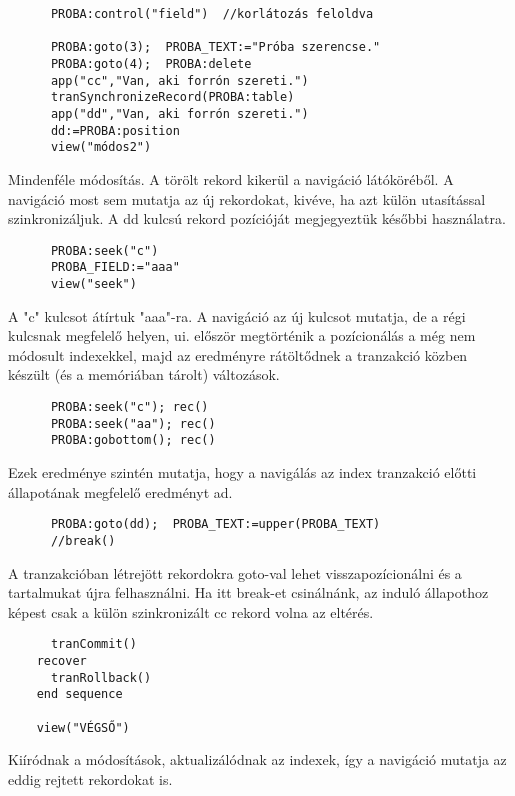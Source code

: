 \begin{verbatim}
      PROBA:control("field")  //korlátozás feloldva
 
      PROBA:goto(3);  PROBA_TEXT:="Próba szerencse." 
      PROBA:goto(4);  PROBA:delete
      app("cc","Van, aki forrón szereti.")
      tranSynchronizeRecord(PROBA:table)
      app("dd","Van, aki forrón szereti.")
      dd:=PROBA:position
      view("módos2")
\end{verbatim}

      Mindenféle módosítás.      
      A törölt rekord kikerül a navigáció látóköréből.
      A navigáció most sem mutatja az új rekordokat,
      kivéve, ha azt külön utasítással szinkronizáljuk.
      A dd kulcsú rekord pozícióját megjegyeztük későbbi
      használatra.

\begin{verbatim}
      PROBA:seek("c")
      PROBA_FIELD:="aaa" 
      view("seek")
\end{verbatim}

      A "c" kulcsot átírtuk {"}aaa"-ra. A navigáció az új kulcsot
      mutatja, de a régi kulcsnak megfelelő helyen, ui. először
      megtörténik a pozícionálás a még nem módosult indexekkel,
      majd az eredményre rátöltődnek a tranzakció közben készült
      (és a memóriában tárolt) változások.

\begin{verbatim}
      PROBA:seek("c"); rec()
      PROBA:seek("aa"); rec()
      PROBA:gobottom(); rec()
\end{verbatim}

      Ezek eredménye szintén mutatja, hogy a navigálás az index
      tranzakció előtti állapotának megfelelő eredményt ad.

\begin{verbatim}
      PROBA:goto(dd);  PROBA_TEXT:=upper(PROBA_TEXT)
      //break()
\end{verbatim}

      A tranzakcióban létrejött rekordokra goto-val lehet
      visszapozícionálni és a tartalmukat újra felhasználni.
      Ha itt break-et csinálnánk, az induló állapothoz képest
      csak a külön szinkronizált cc rekord volna az eltérés.

\begin{verbatim}
      tranCommit()
    recover
      tranRollback()
    end sequence
       
    view("VÉGSŐ")
\end{verbatim}

    Kiíródnak a módosítások, aktualizálódnak az indexek,
    így a navigáció mutatja az eddig rejtett rekordokat is.

